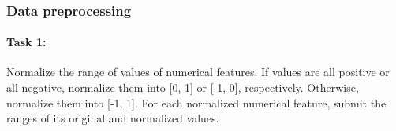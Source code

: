 \documentclass[11pt]{article}
\begin{document}
    \begin{center}
    \end{center}
    { \hspace*{\fill} \\}
    
    \begin{center}
    \end{center}
    { \hspace*{\fill} \\}
    
    \begin{center}
    \end{center}
    { \hspace*{\fill} \\}
    
    \subsubsection*{Data preprocessing}\label{data-preprocessing}

    \paragraph{\texorpdfstring{\textbf{Task 1}:}{Task 1:}}\label{task-1}

Normalize the range of values of numerical features. If values are all
positive or all negative, normalize them into {[}0, 1{]} or {[}-1, 0{]},
respectively. Otherwise, normalize them into {[}-1, 1{]}. For each
normalized numerical feature, submit the ranges of its original and
normalized values.
\end{document}
